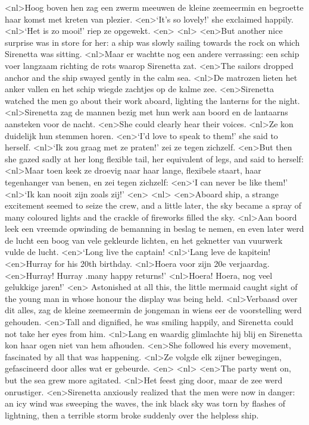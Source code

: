 <nl>Hoog boven hen zag een zwerm meeuwen de kleine zeemeermin en begroette haar komst met kreten van plezier.
<en>`It’s so lovely!' she exclaimed happily.
<nl>`Het is zo mooi!' riep ze opgewekt.
<en>
<nl>
<en>But another nice surprise was in store for her: a ship was slowly sailing towards the rock on which Sirenetta was sitting.
<nl>Maar er wachtte nog een andere verrassing:   een schip voer langzaam richting de rots waarop Sirenetta zat.
<en>The sailors dropped anchor and the ship swayed gently in the calm sea.
<nl>De matrozen lieten het anker vallen en het schip wiegde zachtjes op de kalme zee.
<en>Sirenetta watched the men go about their work aboard, lighting the lanterns for the night.
<nl>Sirenetta zag  de mannen bezig met hun werk aan boord en de lantaarns aansteken voor de nacht.
<en>She could clearly hear their voices.
<nl>Ze kon duidelijk hun stemmen horen.
<en>`I’d love to speak to them!' she said to herself.
<nl>`Ik zou graag met ze praten!' zei ze tegen zichzelf.
<en>But then she gazed sadly at her long flexible tail, her equivalent of legs, and said to herself: 
<nl>Maar toen keek ze droevig naar haar lange, flexibele staart, haar  tegenhanger van benen, en zei tegen zichzelf: 
<en>`I can never be like them!' 
<nl>`Ik kan nooit zijn zoals zij!' 
<en>
<nl>
<en>Aboard ship, a strange excitement seemed to seize the crew, and a little later, the sky became a spray of many coloured lights and the crackle of fireworks filled the sky.
<nl>Aan boord leek een vreemde opwinding de bemanning in beslag te nemen, en even later werd de lucht een boog van vele gekleurde lichten, en het geknetter van vuurwerk vulde de lucht.
<en>`Long live the captain!
<nl>`Lang leve de kapitein!
<en>Hurray for his 20th birthday.
<nl>Hoera voor zijn 20e verjaardag.
<en>Hurray! Hurray .many happy returns!'
<nl>Hoera! Hoera, nog veel gelukkige  jaren!'
<en> Astonished at all this, the little mermaid caught sight of the young man in whose honour the display was being held.
<nl>Verbaasd over dit alles, zag de kleine zeemeermin de jongeman in wiens eer de voorstelling werd gehouden.
<en>Tall and dignified, he was smiling happily, and Sirenetta could not take her eyes from him.
<nl>Lang en waardig glimlachte hij blij en Sirenetta kon haar ogen niet van hem afhouden.
<en>She followed his every movement, fascinated by all that was happening.
<nl>Ze volgde elk zijner bewegingen, gefascineerd door alles wat er gebeurde.
<en>
<nl>
<en>The party went on, but the sea grew more agitated.
<nl>Het feest ging door, maar de zee werd onrustiger.
<en>Sirenetta anxiously realized that the men were now in danger: an icy wind was sweeping the waves, the ink black sky was torn by flashes of lightning, then a terrible storm broke suddenly over the helpless ship.
